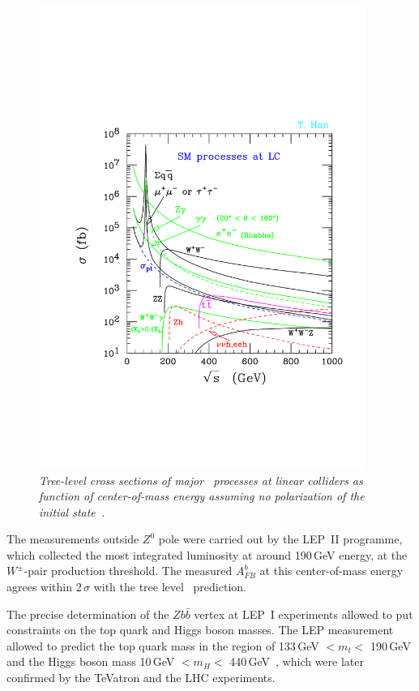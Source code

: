 \begin{figure}[h]
	{\centering
		\includegraphics[clip, trim=0.5cm 5cm 0.5cm 7cm, width=0.95\textwidth]{ILD/graphics/epem_sm-hepph.pdf}
		\caption{\sl Tree-level cross sections of major \sm\ processes at linear colliders as function of center-of-mass energy assuming no polarization of the initial state~\cite{bib:Han}.}
		\label{fig:LCcrosssection}
	}
\end{figure}


The measurements outside $Z^0$ pole were carried out by the LEP~II programme, which collected the most integrated luminosity at around 190\,GeV energy, at the $W^\pm$-pair production threshold. 
The measured $A_{FB}^b$ at this center-of-mass energy agrees within 2\,$\sigma$ with the tree level \sm\ prediction.

The precise determination of the $Zb\bar{b}$ vertex at LEP~I experiments allowed to put constraints on the top quark and Higgs boson masses.
The LEP measurement allowed to predict the top quark mass in the region of 133\,GeV $ < m_t < $ 190\,GeV and the Higgs boson mass  10\,GeV $< m_H <$ 440\,GeV~\cite{bib:LEPTOP}, which were later confirmed by the TeVatron and the LHC experiments. 

